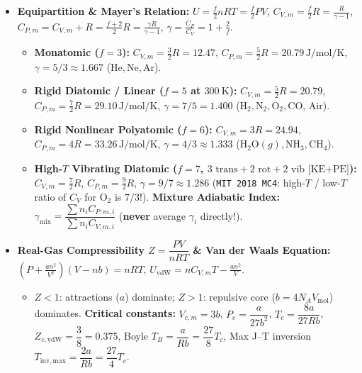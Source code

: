 \documentclass[10pt,twoside,openany,letterpaper]{book}
\begin{document}
\begin{quicksheet}
\begin{formulacard}
\scriptsize
\begin{itemize}
  \item \textbf{Equipartition \& Mayer's Relation:} $\displaystyle U = \frac{f}{2}nRT = \frac{f}{2}PV$, $\displaystyle C_{V,m} = \frac{f}{2}R = \frac{R}{\gamma - 1}$, $\displaystyle C_{P,m} = C_{V,m} + R = \frac{f+2}{2}R = \frac{\gamma R}{\gamma - 1}$, $\displaystyle \gamma = \frac{C_P}{C_V} = 1 + \frac{2}{f}$.
  \begin{itemize}
    \item \textbf{Monatomic ($f=3$):} $C_{V,m} = \frac{3}{2}R = 12.47$, $C_{P,m} = \frac{5}{2}R = 20.79\,\si{\joule\per\mole\per\kelvin}$, $\gamma = 5/3 \approx 1.667$ ($\mathrm{He, Ne, Ar}$).
    \item \textbf{Rigid Diatomic / Linear ($f=5$ at $\SI{300}{\kelvin}$):} $C_{V,m} = \frac{5}{2}R = 20.79$, $C_{P,m} = \frac{7}{2}R = 29.10\,\si{\joule\per\mole\per\kelvin}$, $\gamma = 7/5 = 1.400$ ($\mathrm{H_2, N_2, O_2, CO}$, Air).
    \item \textbf{Rigid Nonlinear Polyatomic ($f=6$):} $C_{V,m} = 3R = 24.94$, $C_{P,m} = 4R = 33.26\,\si{\joule\per\mole\per\kelvin}$, $\gamma = 4/3 \approx 1.333$ ($\mathrm{H_2O}(g), \mathrm{NH_3}, \mathrm{CH_4}$).
    \item \textbf{High-$T$ Vibrating Diatomic ($f=7$, $3\text{ trans}+2\text{ rot}+2\text{ vib [KE+PE]}$):} $C_{V,m} = \frac{7}{2}R$, $C_{P,m} = \frac{9}{2}R$, $\gamma = 9/7 \approx 1.286$ (\texttt{MIT 2018 MC4}: high-$T$ / low-$T$ ratio of $C_V$ for $\mathrm{O_2}$ is $7/3$!). \textbf{Mixture Adiabatic Index:} $\gamma_{\mathrm{mix}} = \dfrac{\sum n_i C_{P,m,i}}{\sum n_i C_{V,m,i}}$ (\textbf{never} average $\gamma_i$ directly!).
  \end{itemize}
  \item \textbf{Real-Gas Compressibility $Z = \dfrac{PV}{nRT}$ \& Van der Waals Equation:} $\displaystyle \boxed{\left(P + \frac{an^2}{V^2}\right)(V - nb) = nRT}$, $\displaystyle U_{\mathrm{vdW}} = nC_{V,m}T - \frac{an^2}{V}$.
  \begin{itemize}
    \item $Z < 1$: attractions ($a$) dominate; $Z > 1$: repulsive core ($b = 4N_A V_{\mathrm{mol}}$) dominates. \textbf{Critical constants:} $V_{c,m} = 3b$, $P_c = \dfrac{a}{27b^2}$, $T_c = \dfrac{8a}{27Rb}$, $Z_{c,\mathrm{vdW}} = \dfrac{3}{8} = 0.375$, Boyle $T_B = \dfrac{a}{Rb} = \dfrac{27}{8}T_c$, Max J--T inversion $T_{\mathrm{inv,max}} = \dfrac{2a}{Rb} = \dfrac{27}{4}T_c$.

\end{itemize}
\end{itemize}
\end{formulacard}
\end{quicksheet}
\end{document}
